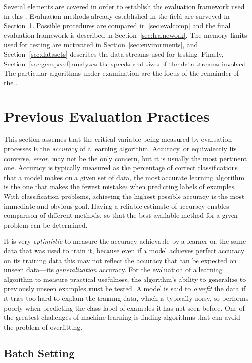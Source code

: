 Several elements are covered in order to establish the evaluation framework used in this \thesisc. Evaluation methods already established in the field are surveyed in Section~\ref{sec:preveval}. Possible procedures are compared in~\ref{sec:evalcomp} and the final evaluation framework is described in Section~\ref{sec:framework}. The memory limits used for testing are motivated in Section~\ref{sec:environments}, and Section~\ref{sec:datasets} describes the data streams used for testing. Finally, Section~\ref{sec:genspeed} analyzes the speeds and sizes of the data streams involved. The particular algorithms under examination are the focus of the remainder of the \thesisc. 

\section{Previous Evaluation Practices}
\label{sec:preveval}

This section assumes that the critical variable being measured by evaluation processes is the {\em accuracy} of a learning algorithm. Accuracy, or equivalently its converse, {\em error}, may not be the only concern, but it is usually the most pertinent one. Accuracy is typically measured as the percentage of correct classifications that a model makes on a given set of data, the most accurate learning algorithm is the one that makes the fewest mistakes when predicting labels of examples. With classification problems, achieving the highest possible accuracy is the most immediate and obvious goal.
Having a reliable estimate of accuracy enables comparison of different methods, so that the best available method for a given problem can be determined.

It is very {\em optimistic} to measure the accuracy achievable by a learner on the same data that was used to train it, because even if a model achieves perfect accuracy on its training data this may not reflect the accuracy that can be expected on unseen data---its {\em generalization} accuracy.
For the evaluation of a learning algorithm to measure practical usefulness, the algorithm's ability to generalize to previously unseen examples must be tested. A model is said to {\em overfit} the data if it tries too hard to explain the training data, which is typically noisy, so performs poorly when predicting the class label of examples it has not seen before. One of the greatest challenges of machine learning is finding algorithms that can avoid the problem of overfitting.

\subsection{Batch Setting}

